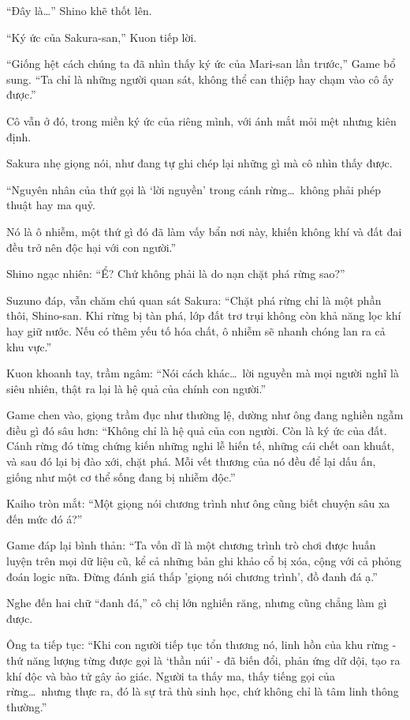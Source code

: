 \documentclass[../main.tex]{subfiles}
\begin{document}
``Đây là\dots'' Shino khẽ thốt lên.

``Ký ức của Sakura-san,'' Kuon tiếp lời.

``Giống hệt cách chúng ta đã nhìn thấy ký ức của Mari-san lần trước,'' Game bổ sung. ``Ta chỉ là những người quan sát, không thể can thiệp hay chạm vào cô ấy được.''

Cô vẫn ở đó, trong miền ký ức của riêng mình, với ánh mắt mỏi mệt nhưng kiên định.

Sakura nhẹ giọng nói, như đang tự ghi chép lại những gì mà cô nhìn thấy được.

``Nguyên nhân của thứ gọi là `lời nguyền' trong cánh rừng\dots\ không phải phép thuật hay ma quỷ.

Nó là ô nhiễm, một thứ gì đó đã làm vấy bẩn nơi này, khiến không khí và đất đai đều trở nên độc hại với con người.''

Shino ngạc nhiên: ``Ể? Chứ không phải là do nạn chặt phá rừng sao?''

Suzuno đáp, vẫn chăm chú quan sát Sakura: ``Chặt phá rừng chỉ là một phần thôi, Shino-san. Khi rừng bị tàn phá, lớp đất trơ trụi không còn khả năng lọc khí hay giữ nước. Nếu có thêm yếu tố hóa chất, ô nhiễm sẽ nhanh chóng lan ra cả khu vực.''

Kuon khoanh tay, trầm ngâm: ``Nói cách khác\dots\ lời nguyền mà mọi người nghĩ là siêu nhiên, thật ra lại là hệ quả của chính con người.''

Game chen vào, giọng trầm đục như thường lệ, dường như ông đang nghiền ngẫm điều gì đó sâu hơn: ``Không chỉ là hệ quả của con người. Còn là ký ức của đất. Cánh rừng đó từng chứng kiến những nghi lễ hiến tế, những cái chết oan khuất, và sau đó lại bị đào xới, chặt phá. Mỗi vết thương của nó đều để lại dấu ấn, giống như một cơ thể sống đang bị nhiễm độc.''

Kaiho tròn mắt: ``Một giọng nói chương trình như ông cũng biết chuyện sâu xa đến mức đó á?''

Game đáp lại bình thản: ``Ta vốn dĩ là một chương trình trò chơi được huấn luyện trên mọi dữ liệu cũ, kể cả những bản ghi khảo cổ bị xóa, cộng với cả phỏng đoán logic nữa. Đừng đánh giá thấp 'giọng nói chương trình', đồ đanh đá ạ.''

Nghe đến hai chữ ``đanh đá,'' cô chị lớn nghiến răng, nhưng cũng chẳng làm gì được.

Ông ta tiếp tục: ``Khi con người tiếp tục tổn thương nó, linh hồn của khu rừng - thứ năng lượng từng được gọi là `thần núi' - đã biến đổi, phản ứng dữ dội, tạo ra khí độc và bào tử gây ảo giác. Người ta thấy ma, thấy tiếng gọi của rừng\dots\ nhưng thực ra, đó là sự trả thù sinh học, chứ không chỉ là tâm linh thông thường.''
\end{document}

